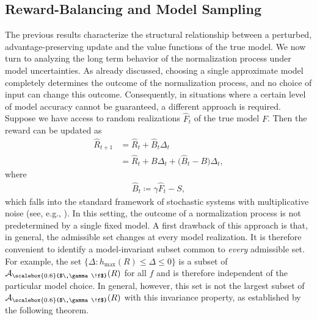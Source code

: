 \documentclass[10pt,leqno]{amsart}
\newcommand{\sml}{\scriptscriptstyle}
\newcommand{\Cost}{R}
\newcommand{\f}{f}
\newcommand{\F}{F}
\newcommand{\Fapx}{\hat{F}}
\newcommand{\disc}{\gamma}
\newcommand{\feasset}[1]{\mathcal{A}_{\scalebox{0.6}{$\,\disc\!\f$}}(#1)}
\newcommand{\Proj}{S}
\newcommand{\B}{B}
\newcommand{\outmap}{h_{\sml \text{max}}}
\newcommand{\Bapx}{\hat{B}}
\newcommand{\Costpert}{\hat{\Cost}}
\begin{document}
\subsection{Reward-Balancing and Model Sampling}
\label{subsec:section_3B}
The previous results characterize the structural relationship between a perturbed, advantage-preserving update and the value functions of the true model. We now turn to analyzing the long term behavior of the normalization process under model uncertainties. As already discussed, choosing a single approximate model completely determines the outcome of the normalization process, and no choice of input can change this outcome. Consequently, in situations where a certain level of model accuracy cannot be guaranteed, a different approach is required. Suppose we have access to random realizations $\Fapx_t$ of the true model $\F$. Then the reward can be updated as
\begin{subequations}\label{eq:random_reward_update}
    \begin{align}
        \Costpert_{t + 1} &= \Costpert_t + \Bapx_t \Delta_t\\
        &= \Costpert_t + \B \Delta_t + \bigl(\Bapx_t - \B\bigr)\Delta_t,
    \end{align}
\end{subequations}
where
\begin{align}\label{eq:B_sample_def}
    \Bapx_t \coloneqq \disc \Fapx_t - \Proj,
\end{align}
which falls into the standard framework of stochastic systems with multiplicative noise (see, e.g., \cite{gravell2020robust, coppens2020data}). In this setting, the outcome of a normalization process is not predetermined by a single fixed model. A first drawback of this approach is that, in general, the admissible set changes at every model realization. It is therefore convenient to identify a model-invariant subset common to \emph{every} admissible set. For example, the set $\{\Delta : \outmap(\Cost) \leq \Delta \leq 0\}$ is a subset of $\feasset{\Cost}$ for all $\f$ and is therefore independent of the particular model choice. In general, however, this set is not the largest subset of $\feasset{\Cost}$ with this invariance property, as established by the following theorem.
\end{document}
